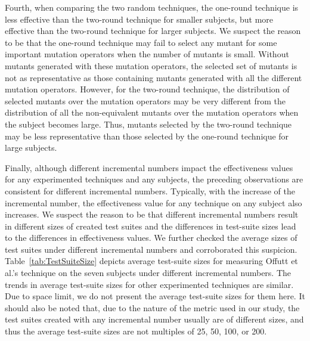 Fourth, when comparing the two random techniques, the one-round
technique is less effective than the two-round technique for
smaller subjects, but more effective than the two-round technique
for larger subjects. We suspect the reason to be that the
one-round technique may fail to select any mutant for some
important mutation operators when the number of mutants is small.
Without mutants generated with these mutation operators, the
selected set of mutants is not as representative as those
containing mutants generated with all the different mutation
operators. However, for the two-round technique, the distribution
of selected mutants over the mutation operators may be very
different from the distribution of all the non-equivalent mutants
over the mutation operators when the subject becomes large. Thus,
mutants selected by the two-round technique may be less
representative than those selected by the one-round technique for
large subjects.

Finally, although different incremental numbers impact the
effectiveness values for any experimented techniques and any
subjects, the preceding observations are consistent for different
incremental numbers. Typically, with the increase of the
incremental number, the effectiveness value for any technique on
any subject also increases. We suspect the reason to be that
different incremental numbers result in different sizes of created
test suites and the differences in test-suite sizes lead to the
differences in effectiveness values. We further checked the
average sizes of test suites under different incremental numbers
and corroborated this suspicion. Table~\ref{tab:TestSuiteSize}
depicts average test-suite sizes for measuring Offutt et al.'s
technique on the seven subjects under different incremental
numbers. The trends in average test-suite sizes for other
experimented techniques are similar. Due to space limit, we do not
present the average test-suite sizes for them here. It should also
be noted that, due to the nature of the metric used in our study,
the test suites created with any incremental number usually are of
different sizes, and thus the average test-suite sizes are not
multiples of 25, 50, 100, or 200.

